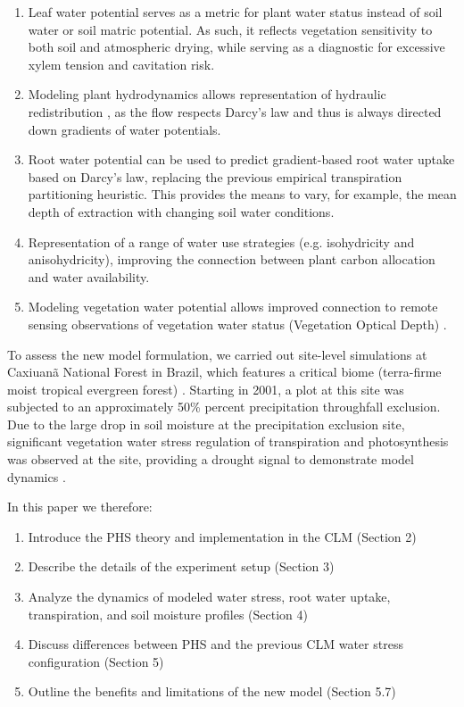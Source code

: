\documentclass[draft,linenumbers]{agujournal}
\begin{document}
\begin{enumerate}
\item Leaf water potential serves as a metric for plant water status instead of soil water or soil matric potential. As such, it reflects vegetation sensitivity to both soil and atmospheric drying, while serving as a diagnostic for excessive xylem tension and cavitation risk. 
\item Modeling plant hydrodynamics allows representation of hydraulic redistribution \citep{lee2005}, as the flow respects Darcy's law and thus is always directed down gradients of water potentials. 
\item Root water potential can be used to predict gradient-based root water uptake based on Darcy's law, replacing the previous empirical transpiration partitioning heuristic. This provides the means to vary, for example, the mean depth of extraction with changing soil water conditions.
\item Representation of a range of water use strategies (e.g. isohydricity and anisohydricity), improving the connection between plant carbon allocation and water availability.
\item Modeling vegetation water potential allows improved connection to remote sensing observations of vegetation water status (Vegetation Optical Depth) \citep{konings2016}. 
\end{enumerate}

To assess the new model formulation, we carried out site-level simulations at Caxiuan\~a National Forest in Brazil, which features a critical biome (terra-firme moist tropical evergreen forest) \citep{fisher2006}. Starting in 2001, a plot at this site was subjected to an approximately 50\% percent precipitation throughfall exclusion. Due to the large drop in soil moisture at the precipitation exclusion site, significant vegetation water stress regulation of transpiration and photosynthesis was observed at the site, providing a drought signal to demonstrate model dynamics \citep{fisher2007}.

In this paper we therefore:
\begin{enumerate}
\item Introduce the PHS theory and implementation in the CLM (Section 2)
\item Describe the details of the experiment setup (Section 3)
\item Analyze the dynamics of modeled water stress, root water uptake, transpiration, and soil moisture profiles (Section 4)
\item Discuss differences between PHS and the previous CLM water stress configuration (Section 5)
\item Outline the benefits and limitations of the new model (Section 5.7)
\end{enumerate}
\end{document}
